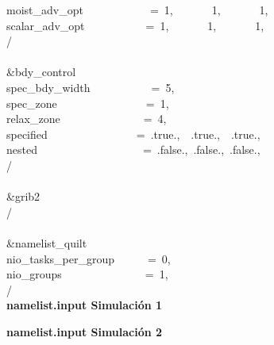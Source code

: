 moist\_adv\_opt~~~~~~~~~~~~=~1,~~~~~~~1,~~~~~~~1,~~~~~~~~~~\\
scalar\_adv\_opt~~~~~~~~~~~=~1,~~~~~~~1,~~~~~~~1,~~~~~~~~~~\\
/\\
\\
\&bdy\_control~~~~~~~~~~~~~\\
spec\_bdy\_width~~~~~~~~~~~=~5,\\
spec\_zone~~~~~~~~~~~~~~~~=~1,\\
relax\_zone~~~~~~~~~~~~~~~=~4,\\
specified~~~~~~~~~~~~~~~~=~.true.,~~.true.,~~.true.,~~\\
nested~~~~~~~~~~~~~~~~~~~=~.false.,~.false.,~.false.,~~\\
/\\
\\
\&grib2~~~~~~~~~~~~~~~~~~~\\
/\\
\\
\&namelist\_quilt~~~~~~~~~~\\
nio\_tasks\_per\_group~~~~~~=~0,\\
nio\_groups~~~~~~~~~~~~~~~=~1,\\
/\\



\textbf{namelist.input Simulación 1}


\textbf{namelist.input Simulación 2}

